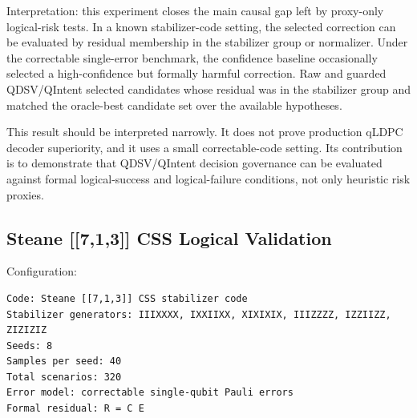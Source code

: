 \documentclass[11pt]{article}
\begin{document}
Interpretation: this experiment closes the main causal gap left by proxy-only logical-risk tests. In a known stabilizer-code setting, the selected correction can be evaluated by residual membership in the stabilizer group or normalizer. Under the correctable single-error benchmark, the confidence baseline occasionally selected a high-confidence but formally harmful correction. Raw and guarded QDSV/QIntent selected candidates whose residual was in the stabilizer group and matched the oracle-best candidate set over the available hypotheses.


This result should be interpreted narrowly. It does not prove production qLDPC decoder superiority, and it uses a small correctable-code setting. Its contribution is to demonstrate that QDSV/QIntent decision governance can be evaluated against formal logical-success and logical-failure conditions, not only heuristic risk proxies.


\subsection{Steane [[7,1,3]] CSS Logical Validation}

Configuration:


\begin{lstlisting}
Code: Steane [[7,1,3]] CSS stabilizer code
Stabilizer generators: IIIXXXX, IXXIIXX, XIXIXIX, IIIZZZZ, IZZIIZZ, ZIZIZIZ
Seeds: 8
Samples per seed: 40
Total scenarios: 320
Error model: correctable single-qubit Pauli errors
Formal residual: R = C E
\end{lstlisting}
\end{document}
